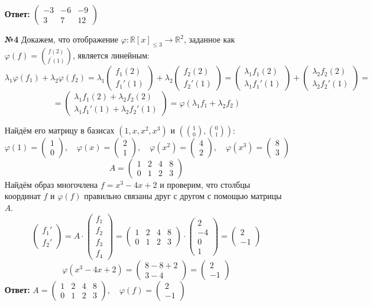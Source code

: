 \documentclass[a4paper]{article}
\newcommand{\mat}[1]{\begin{pmatrix} #1 \end{pmatrix}}
\renewcommand{\f}[2]{\frac{#1}{#2}}
\renewcommand{\phi}{\varphi}
\begin{document}
\begin{enumerate}
    \textbf{Ответ: }$\mat{-3 & -6 & -9 \\
        3 & 7 & 12}$\\
    
    \item[\textbf{№4}]Докажем, что отображение $\varphi: \mathbb{R}[x]_{\leqslant 3} \rightarrow \mathbb{R}^{2}$, заданное как $\varphi(f)=\binom{f(2)}{f^{\prime}(1)}$, является линейным:
    $$\lambda_1\phi(f_1) + \lambda_2\phi(f_2) = \lambda_1\mat{f_1(2) \\ f_1'(1)} + \lambda_2\mat{f_2(2)\\f_2'(1)} = \mat{\lambda_1f_1(2) \\ \lambda_1f_1'(1)} + \mat{\lambda_2 f_2(2)\\\lambda_2 f_2'(1)} =$$
    $$=\mat{\lambda_1f_1(2) + \lambda_2 f_2(2)\\ \lambda_1f_1'(1) + \lambda_2 f_2'(1)} = \phi(\lambda_1 f_1 + \lambda_2 f_2)$$

    Найдём его матрицу в базисах $(1, x, x^{2}, x^{3})$ и $\left(\binom{1}{0},\binom{0}{1}\right)$:
    $$\phi(1) = \mat{1\\0}, \quad \phi(x) = \mat{2\\1}, \quad \phi(x^2) = \mat{4 \\ 2}, \quad \phi(x^3) = \mat{8\\3}$$
    $$A = \mat{1 & 2 & 4 & 8 \\ 0 & 1 & 2 & 3}$$
    Найдём образ многочлена $f=x^{3}-4x+2$ и проверим, что столбцы координат $f$ и $\varphi(f)$ правильно связаны друг с другом с помощью матрицы $A$.
    $$\mat{f_1' \\ f_2'} = A\cdot \mat{f_1\\ f_2\\ f_3\\f_4} = \mat{1 & 2 & 4 & 8 \\ 0 & 1 & 2 & 3} \cdot \mat{2\\-4\\0\\ 1} = \mat{2 \\ -1}$$
    $$\phi(x^3-4x+2) = \mat{8-8+2 \\ 3-4} = \mat{2\\-1}$$
    \textbf{Ответ: }$A = \mat{1 & 2 & 4 & 8 \\ 0 & 1 & 2 & 3}, \quad \phi(f) = \mat{2\\-1}$


\end{enumerate}
\end{document}
